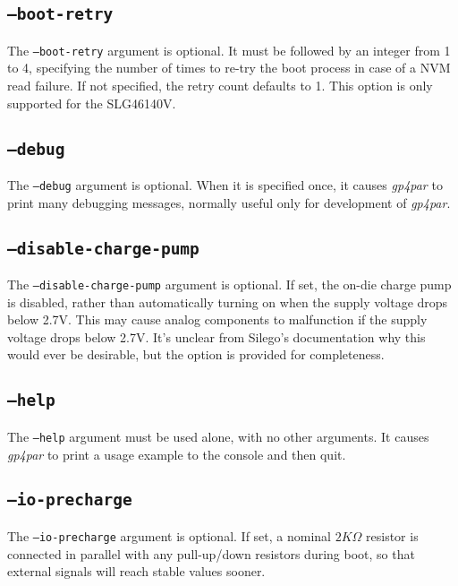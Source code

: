\documentclass[11pt]{article}
\newcommand{\namestyle}[1]{\textit{#1}}
\begin{document}
\subsection{\texttt{--boot-retry}}

The \texttt{--boot-retry} argument is optional. It must be followed by an integer from 1 to 4, specifying the number of times
to re-try the boot process in case of a NVM read failure. If not specified, the retry count defaults to 1. This option is
only supported for the SLG46140V.

\subsection{\texttt{--debug}}

The \texttt{--debug} argument is optional. When it is specified once, it causes \namestyle{gp4par} to print
many debugging messages, normally useful only for development of \namestyle{gp4par}.

\subsection{\texttt{--disable-charge-pump}}

The \texttt{--disable-charge-pump} argument is optional. If set, the on-die charge pump is disabled, rather than 
automatically turning on when the supply voltage drops below 2.7V. This may cause analog components to malfunction if the 
supply voltage drops below 2.7V. It's unclear from Silego's documentation why this would ever be desirable, but the option 
is provided for completeness.

\subsection{\texttt{--help}}

The \texttt{--help} argument must be used alone, with no other arguments. It causes \namestyle{gp4par} to print a usage
example to the console and then quit.

\subsection{\texttt{--io-precharge}}

The \texttt{--io-precharge} argument is optional. If set, a nominal $2K \Omega$ resistor is connected in parallel with any
pull-up/down resistors during boot, so that external signals will reach stable values sooner.
\end{document}
